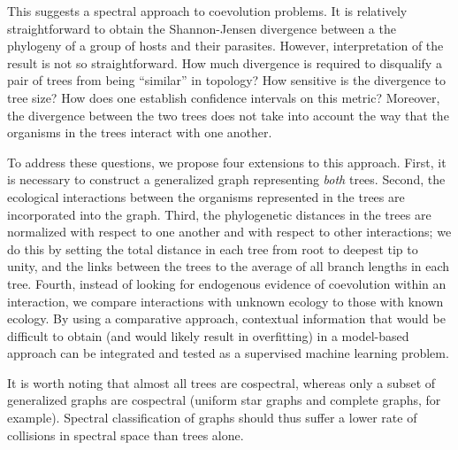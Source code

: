 This suggests a spectral approach to coevolution problems. It is relatively straightforward to obtain the Shannon-Jensen divergence between a the phylogeny of a group of hosts and their parasites. However, interpretation of the result is not so straightforward. How much divergence is required to disqualify a pair of trees from being ``similar'' in topology? How sensitive is the divergence to tree size? How does one establish confidence intervals on this metric? Moreover, the divergence between the two trees does not take into account the way that the organisms in the trees interact with one another. 

To address these questions, we propose four extensions to this approach. First, it is necessary to construct a generalized graph representing {\em both} trees. Second, the ecological interactions between the organisms represented in the trees are incorporated into the graph. Third, the phylogenetic distances in the trees are normalized with respect to one another and with respect to other interactions; we do this by setting the total distance in each tree from root to deepest tip to unity, and the links between the trees to the average of all branch lengths in each tree. Fourth, instead of looking for endogenous evidence of coevolution within an interaction, we compare interactions with unknown ecology to those with known ecology. By using a comparative approach, contextual information that would be difficult to obtain (and would likely result in overfitting) in a model-based approach can be integrated and tested as a supervised machine learning problem.

It is worth noting that almost all trees are cospectral, \cite{schwenk1973almost} whereas only a subset of generalized graphs are cospectral (uniform star graphs and complete graphs, for example). Spectral classification of graphs should thus suffer a lower rate of collisions in spectral space than trees alone. 
